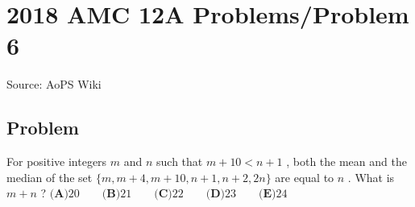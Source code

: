 \documentclass[12pt]{article}
\begin{document}
\section*{{2018 AMC 12A Problems/Problem 6}}
Source: AoPS Wiki

\subsection*{Problem}
For positive integers $m$ and $n$ such that $m+10<n+1$ , both the mean and the median of the set $\{m, m+4, m+10, n+1, n+2, 2n\}$ are equal to $n$ . What is $m+n$ ? $\textbf{(A)}20\qquad\textbf{(B)}21\qquad\textbf{(C)}22\qquad\textbf{(D)}23\qquad\textbf{(E)}24$
\end{document}
